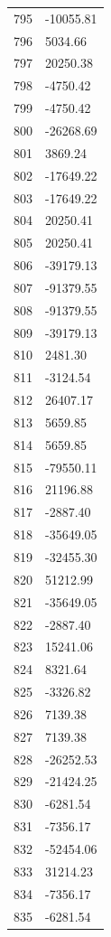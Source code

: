 \documentclass[a4paper,11pt]{article}
\begin{document}
\begin{center}
\begin{longtable}{|R{1.5cm}|R{2.6cm}|}
  795 &    -10055.81 \\
  796 &      5034.66 \\
  797 &     20250.38 \\
  798 &     -4750.42 \\
  799 &     -4750.42 \\
  800 &    -26268.69 \\
  801 &      3869.24 \\
  802 &    -17649.22 \\
  803 &    -17649.22 \\
  804 &     20250.41 \\
  805 &     20250.41 \\
  806 &    -39179.13 \\
  807 &    -91379.55 \\
  808 &    -91379.55 \\
  809 &    -39179.13 \\
  810 &      2481.30 \\
  811 &     -3124.54 \\
  812 &     26407.17 \\
  813 &      5659.85 \\
  814 &      5659.85 \\
  815 &    -79550.11 \\
  816 &     21196.88 \\
  817 &     -2887.40 \\
  818 &    -35649.05 \\
  819 &    -32455.30 \\
  820 &     51212.99 \\
  821 &    -35649.05 \\
  822 &     -2887.40 \\
  823 &     15241.06 \\
  824 &      8321.64 \\
  825 &     -3326.82 \\
  826 &      7139.38 \\
  827 &      7139.38 \\
  828 &    -26252.53 \\
  829 &    -21424.25 \\
  830 &     -6281.54 \\
  831 &     -7356.17 \\
  832 &    -52454.06 \\
  833 &     31214.23 \\
  834 &     -7356.17 \\
  835 &     -6281.54 \\

\end{longtable}
\end{center}
\end{document}
